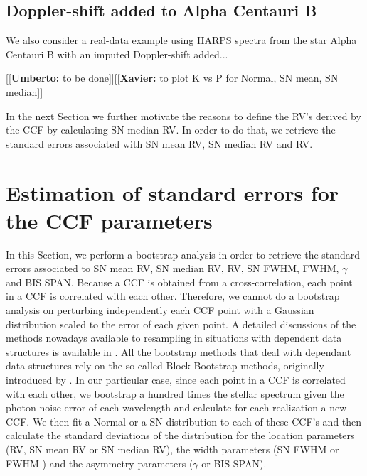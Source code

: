 \documentclass[11pt, oneside]{article}
\newcommand{\xavier}[1]{{\color{blue}[[\textbf{Xavier: }#1]]}}
\newcommand{\umberto}[1]{{\color{green}[[\textbf{Umberto: }#1]]}}
\begin{document}
\subsection{Doppler-shift added to Alpha Centauri B} \label{sec:soap_real}

We also consider a real-data example using HARPS spectra from the star Alpha Centauri B with an imputed Doppler-shift added...

\umberto{to be done}\xavier{to plot K vs P for Normal, SN mean, SN median}

In the next Section we further motivate the reasons to define the RV's derived by the CCF by calculating SN median RV. In order to do that, we retrieve the standard errors associated with SN mean RV, SN median RV and RV.

\section{Estimation of standard errors for the CCF parameters} \label{sec:5}

In this Section, we perform a bootstrap analysis \citep{davison1997bootstrap, efron1994introduction} in order to retrieve the standard errors associated to SN mean RV, SN median RV, RV, SN FWHM, FWHM, $\gamma$ and BIS SPAN. Because a CCF is obtained from a cross-correlation, each point in a CCF is correlated with each other. Therefore, we cannot do a bootstrap analysis on perturbing independently each CCF point with a Gaussian distribution scaled to the error of each given point. A detailed discussions of the methods nowadays available to resampling in situations with dependent data structures is available in \citet{lahiri2013resampling}. All the bootstrap methods that deal with dependant data structures rely on the so called Block Bootstrap methods, originally introduced by \citet{wilks1997resampling}. In our particular case, since each point in a CCF is correlated with each other, we bootstrap a hundred times the stellar spectrum given the photon-noise error of each wavelength and calculate for each realization a new CCF. We then fit a Normal or a SN distribution to each of these CCF's and then calculate the standard deviations of the distribution for the location parameters (RV, SN mean RV or SN median RV), the width parameters (SN FWHM or FWHM ) and the asymmetry parameters ($\gamma$ or BIS SPAN).
\end{document}
